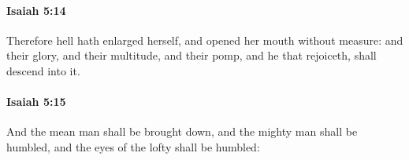 		\paragraph{Isaiah 5:14} %
			\label{ISAIAH-5-14}

			Therefore hell hath enlarged herself, and opened her mouth without measure: and their glory, and their multitude, and their pomp, and he that rejoiceth, shall descend into it.


		\paragraph{Isaiah 5:15} %
			\label{ISAIAH-5-15}

			And the mean man shall be brought down, and the mighty man shall be humbled, and the eyes of the lofty shall be humbled:


